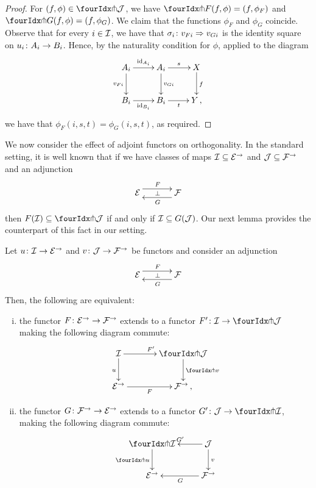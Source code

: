 \documentclass[reqno,10pt,a4paper,oneside]{amsart}
\begin{document}
\begin{proof} For $(f, \phi) \in \liftr{\cal{J}}$, we have $\liftr{F}(f, \phi) = (f, \phi_F)$ and $\liftr{G}(f, \phi) = (f, \phi_G)$.
We claim that the functions $\phi_F$ and $\phi_G$ coincide. Observe that 
for every $i \in \cal{I}$, we have that $\sigma_i \co v_{Fi}  \Rightarrow v_{Gi}$ is the identity square on $u_i
\co A_i \to B_i$. Hence, by the naturality condition for $\phi$, applied to the diagram 
\[
\xymatrix{
A_i \ar[r]^{\id_{A_i}} \ar[d]_{v_{Fi}}  & A_i \ar[d]^{v_{Gi}} \ar[r]^{s}  & X \ar[d]^{f} \\
B_i \ar[r]_{\id_{B_i}} & B_i \ar[r]_{t} & Y \, ,}
\]
we have  that $\phi_F(i, s, t) = \phi_G(i, s, t)$, as required.
\end{proof} 

\medskip

We now consider the effect of adjoint functors on orthogonality. In the standard setting, it is well known that if 
we have classes of maps $\cal{I} \subseteq \cal{E}^\to$ and $\cal{J} \subseteq \cal{F}^\to$ and an adjunction
\[
\xymatrix@C+1em{
  \cal{E}
  \ar@<5pt>[r]^{F}
  \ar@{}[r]|{\bot}
&
  \cal{F}
  \ar@<5pt>[l]^{G}
}
\]
then $F(\cal{I}) \subseteq \liftl{\cal{J}}$ if and only if $\cal{I} \subseteq G(\cal{J})$. Our next lemma provides the counterpart of this fact in our setting.




\begin{proposition} \label{lift-of-adjunction} 
Let $u \co \cal{I} \to \cal{E}^{\to}$ and $v \co \cal{J} \to \cal{F}^{\to}$ be functors and consider an adjunction
\[
\xymatrix@C+1em{
  \cal{E}
  \ar@<5pt>[r]^{F}
  \ar@{}[r]|{\bot}
&
  \cal{F}
  \ar@<5pt>[l]^{G}
}
\]
Then, the following are equivalent:
\begin{enumerate}[(i)] 
\item the  functor $F \co \cal{E}^\to \to \cal{F}^\to$ extends to a functor $F' \co \cal{I} \to \liftl{\cal{J}}$ making the following diagram commute:
\[
\xymatrix@C=1.2cm{
  \cal{I}
  \ar[r]^{F'}
  \ar[d]_{u}
&
  \liftl{\cal{J}}
  \ar[d]^{\liftl{v}}
\\
  \cal{E}^{\to}
  \ar[r]_-{F}
&
  \cal{F}^{\to}\, ,}
\]
\item the functor $G \co \cal{F}^\to \to \cal{E}^\to$ extends to a functor $G' \co \cal{J} \to \liftr{\cal{I}}$, making the following diagram commute:
\[
\xymatrix{
  \liftr{\cal{I}}
  \ar[d]_{\liftr{u}}
&
  \cal{J}
  \ar[l]_{G'} 
  \ar[d]^{v}
\\
  \cal{E}^{\to}
&
  \cal{F}^{\to}
  \ar[l]^{G}
}
\]
\end{enumerate}
\end{proposition}
\end{document}
